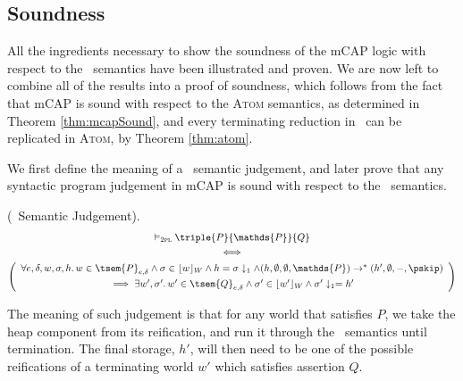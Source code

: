 %

%

%

%

\subsection{Soundness}

All the ingredients necessary to show the soundness of the mCAP logic with respect to the \tpl\ semantics have been illustrated and proven. We are now left to combine all of the results into a proof of soundness, which follows from the fact that mCAP is sound with respect to the \textsc{Atom} semantics, as determined in Theorem \ref{thm:mcapSound}, and every terminating reduction in \tpl\ can be replicated in \textsc{Atom}, by Theorem \ref{thm:atom}.

We first define the meaning of a \tpl\ semantic judgement, and later prove that any syntactic program judgement in mCAP is sound with respect to the \tpl\ semantics.
\begin{defn}
	(\tpl\ Semantic Judgement).
	\begin{gather*}
		\vDash_\textsc{2pl} \triple{P}{\mathds{P}}{Q} \\
		\iff \\
		\left(
		\begin{array}{c}
			\forall e, \delta, w, \sigma, h \ldotp
			w \in \tsem{P}_{e, \delta} \land \sigma \in \lfloor w \rfloor_W \land h = \sigma \downarrow_1 \land (h, \emptyset, \emptyset, \mathds{P}) \rightarrow^* (h', \emptyset, -, \pskip) \\[0.4em]
			\implies \exists w', \sigma' \ldotp w' \in \tsem{Q}_{e, \delta} \land \sigma' \in \lfloor w' \rfloor_W \land \sigma' \downarrow_1 = h'
		\end{array}
		\right)
	\end{gather*}
\end{defn}

The meaning of such judgement is that for any world that satisfies $P$, we take the heap component from its reification, and run it through the \tpl\ semantics until termination. The final storage, $h'$, will then need to be one of the possible reifications of a terminating world $w'$ which satisfies assertion $Q$.

